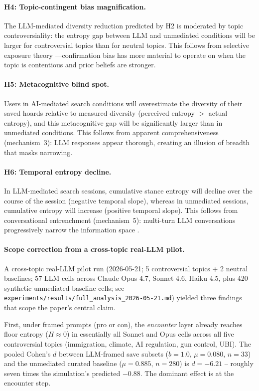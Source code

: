 \documentclass[12pt,a4paper]{article}
\begin{document}
\paragraph{H4: Topic-contingent bias magnification.}
The LLM-mediated diversity reduction predicted by H2 is moderated by topic controversiality: the entropy gap between LLM and unmediated conditions will be larger for controversial topics than for neutral topics.
This follows from selective exposure theory \citep{Klapper1960}---confirmation bias has more material to operate on when the topic is contentious and prior beliefs are stronger.

\paragraph{H5: Metacognitive blind spot.}
Users in AI-mediated search conditions will overestimate the diversity of their saved hoards relative to measured diversity (perceived entropy $>$ actual entropy), and this metacognitive gap will be significantly larger than in unmediated conditions.
This follows from apparent comprehensiveness (mechanism~3): LLM responses appear thorough, creating an illusion of breadth that masks narrowing.

\paragraph{H6: Temporal entropy decline.}
In LLM-mediated search sessions, cumulative stance entropy will decline over the course of the session (negative temporal slope), whereas in unmediated sessions, cumulative entropy will increase (positive temporal slope).
This follows from conversational entrenchment (mechanism~5): multi-turn LLM conversations progressively narrow the information space \citep{Kang2025}.

\paragraph{Scope correction from a cross-topic real-LLM pilot.}
A cross-topic real-LLM pilot run (2026-05-21; 5 controversial topics + 2 neutral baselines; 57 LLM cells across Claude Opus 4.7, Sonnet 4.6, Haiku 4.5, plus 420 synthetic unmediated-baseline cells; see \texttt{experiments/results/full\_analysis\_2026-05-21.md}) yielded three findings that scope the paper's central claim.

First, under framed prompts (pro or con), the \emph{encounter} layer already reaches floor entropy ($H \approx 0$) in essentially all Sonnet and Opus cells across all five controversial topics (immigration, climate, AI regulation, gun control, UBI).
The pooled Cohen's $d$ between LLM-framed save subsets ($b=1.0$, $\mu = 0.080$, $n = 33$) and the unmediated curated baseline ($\mu = 0.885$, $n = 280$) is $d = -6.21$ -- roughly seven times the simulation's predicted $-0.88$.
The dominant effect is at the encounter step.
\end{document}
